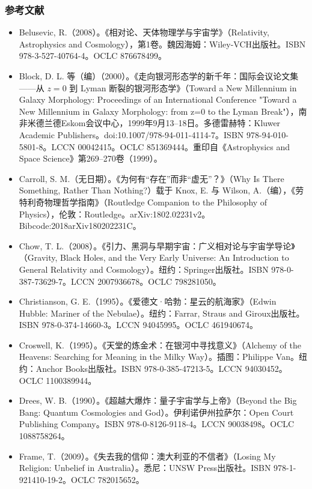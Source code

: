 \subsubsection{参考文献}
\begin{itemize}
\item Belusevic, R.（2008）。《相对论、天体物理学与宇宙学》（Relativity, Astrophysics and Cosmology），第1卷。魏因海姆：Wiley-VCH出版社。ISBN 978-3-527-40764-4。OCLC 876678499。  
\item Block, D. L. 等（编）（2000）。《走向银河形态学的新千年：国际会议论文集——从 $z=0$ 到 Lyman 断裂的银河形态学》（Toward a New Millennium in Galaxy Morphology: Proceedings of an International Conference "Toward a New Millennium in Galaxy Morphology: from z=0 to the Lyman Break"），南非米德兰德Eskom会议中心，1999年9月13–18日。多德雷赫特：Kluwer Academic Publishers。doi:10.1007/978-94-011-4114-7。ISBN 978-94-010-5801-8。LCCN 00042415。OCLC 851369444。重印自《Astrophysics and Space Science》第269–270卷（1999）。  
\item Carroll, S. M.（无日期）。《为何有“存在”而非“虚无”？》（Why Is There Something, Rather Than Nothing?）载于 Knox, E. 与 Wilson, A.（编），《劳特利奇物理哲学指南》（Routledge Companion to the Philosophy of Physics），伦敦：Routledge。arXiv:1802.02231v2。Bibcode:2018arXiv180202231C。  
\item Chow, T. L.（2008）。《引力、黑洞与早期宇宙：广义相对论与宇宙学导论》（Gravity, Black Holes, and the Very Early Universe: An Introduction to General Relativity and Cosmology）。纽约：Springer出版社。ISBN 978-0-387-73629-7。LCCN 2007936678。OCLC 798281050。  
\item Christianson, G. E.（1995）。《爱德文·哈勃：星云的航海家》（Edwin Hubble: Mariner of the Nebulae）。纽约：Farrar, Straus and Giroux出版社。ISBN 978-0-374-14660-3。LCCN 94045995。OCLC 461940674。  
\item Croswell, K.（1995）。《天堂的炼金术：在银河中寻找意义》（Alchemy of the Heavens: Searching for Meaning in the Milky Way）。插图：Philippe Van。纽约：Anchor Books出版社。ISBN 978-0-385-47213-5。LCCN 94030452。OCLC 1100389944。  
\item Drees, W. B.（1990）。《超越大爆炸：量子宇宙学与上帝》（Beyond the Big Bang: Quantum Cosmologies and God）。伊利诺伊州拉萨尔：Open Court Publishing Company。ISBN 978-0-8126-9118-4。LCCN 90038498。OCLC 1088758264。  
\item Frame, T.（2009）。《失去我的信仰：澳大利亚的不信者》（Losing My Religion: Unbelief in Australia）。悉尼：UNSW Press出版社。ISBN 978-1-921410-19-2。OCLC 782015652。  

\end{itemize}
